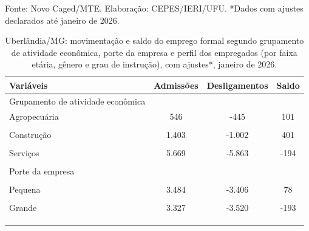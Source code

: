 \documentclass[
  12pt,
]{article}
\begin{document}
\begin{ThreePartTable}
\begin{TableNotes}
\item Fonte: Novo Caged/MTE. Elaboração: CEPES/IERI/UFU. *Dados com ajustes declarados até janeiro de 2026.
\end{TableNotes}
\begin{longtable}[t]{>{\centering\arraybackslash}p{14cm}ccc}
\caption{\label{tab:tabela4}Uberlândia/MG: movimentação e saldo do emprego formal segundo grupamento de atividade econômica, porte da empresa e perfil dos empregados (por faixa etária, gênero e grau de instrução), com ajustes*, janeiro de 2026.}\\
\toprule
Variáveis & Admissões & Desligamentos & Saldo\\
\midrule
Grupamento de atividade econômica\cellcolor{gray!10}{} & \cellcolor{gray!10}{} & \cellcolor{gray!10}{ \vphantom{3}} & \cellcolor{gray!10}{}\\
Agropecuária & 546 & -445 & 101\\
\cellcolor{gray!10}{Comércio} & \cellcolor{gray!10}{3.121} & \cellcolor{gray!10}{-3.262} & \cellcolor{gray!10}{-141}\\
Construção & 1.403 & -1.002 & 401\\
\cellcolor{gray!10}{Indústria} & \cellcolor{gray!10}{1.414} & \cellcolor{gray!10}{-1.107} & \cellcolor{gray!10}{307}\\
\addlinespace
Serviços & 5.669 & -5.863 & -194\\
 &  &  \vphantom{2} & \\
Porte da empresa\cellcolor{gray!10}{} & \cellcolor{gray!10}{} & \cellcolor{gray!10}{ \vphantom{1}} & \cellcolor{gray!10}{}\\
\cellcolor{gray!10}{MEI e Micro} & \cellcolor{gray!10}{3.492} & \cellcolor{gray!10}{-2.925} & \cellcolor{gray!10}{567}\\
Pequena & 3.484 & -3.406 & 78\\
\addlinespace
\cellcolor{gray!10}{Média} & \cellcolor{gray!10}{1.837} & \cellcolor{gray!10}{-1.819} & \cellcolor{gray!10}{18}\\
Grande & 3.327 & -3.520 & -193\\
\cellcolor{gray!10}{Administração Pública} & \cellcolor{gray!10}{13} & \cellcolor{gray!10}{-9} & \cellcolor{gray!10}{4}\\
\cellcolor{gray!10}{} & \cellcolor{gray!10}{} & \cellcolor{gray!10}{} & \cellcolor{gray!10}{}\\
\cellcolor{gray!10}{Faixa Etária} & \cellcolor{gray!10}{} & \cellcolor{gray!10}{} & \cellcolor{gray!10}{}\\

\end{longtable}
\end{ThreePartTable}
\end{document}
